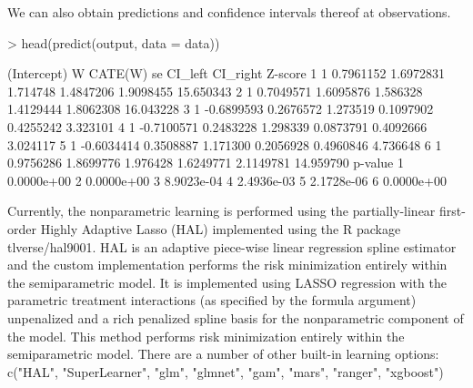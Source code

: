 \documentclass[article]{jss}
\begin{document}
We can also obtain predictions and confidence intervals thereof at observations.
\begin{Schunk}
\begin{Sinput}
> head(predict(output, data = data))
\end{Sinput}
\begin{Soutput}
  (Intercept)          W   CATE(W)       se   CI_left  CI_right   Z-score
1           1  0.7961152 1.6972831 1.714748 1.4847206 1.9098455 15.650343
2           1  0.7049571 1.6095876 1.586328 1.4129444 1.8062308 16.043228
3           1 -0.6899593 0.2676572 1.273519 0.1097902 0.4255242  3.323101
4           1 -0.7100571 0.2483228 1.298339 0.0873791 0.4092666  3.024117
5           1 -0.6034414 0.3508887 1.171300 0.2056928 0.4960846  4.736648
6           1  0.9756286 1.8699776 1.976428 1.6249771 2.1149781 14.959790
     p-value
1 0.0000e+00
2 0.0000e+00
3 8.9023e-04
4 2.4936e-03
5 2.1728e-06
6 0.0000e+00
\end{Soutput}
\end{Schunk}

Currently, the nonparametric learning is performed using the partially-linear first-order Highly Adaptive Lasso (HAL) implemented using the R package tlverse/hal9001. HAL is an adaptive piece-wise linear regression spline estimator and the custom implementation performs the risk minimization entirely within the semiparametric model. It is implemented using LASSO regression with the parametric treatment interactions (as specified by the formula argument) unpenalized and a rich penalized spline basis for the nonparametric component of the model. This method performs risk minimization entirely within the semiparametric model. There are a number of other built-in learning options: c("HAL", "SuperLearner", "glm", "glmnet", "gam", "mars", "ranger", "xgboost")
\end{document}
